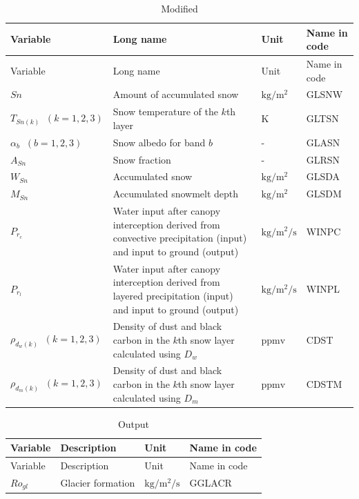 \begin{landscape}

\begin{longtable}[]{@{}llll@{}}
\caption{Modified}\tabularnewline
\toprule\noalign{}
Variable & Long name & Unit & Name in code \\
\midrule\noalign{}
\endfirsthead
\toprule\noalign{}
Variable & Long name & Unit & Name in code \\
\midrule\noalign{}
\endhead
\bottomrule\noalign{}
\endlastfoot
\(Sn\) & Amount of accumulated snow & \(\mathrm{kg/m^2}\) & GLSNW \\
\(T_{Sn(k)} \;\; (k=1,2,3)\) & Snow temperature of the \(k\)th layer & \(\mathrm{K}\) & GLTSN \\
\(\alpha_b  \;\; (b=1,2,3)\) & Snow albedo for band \(b\) & - & GLASN \\
\(A_{Sn}\) & Snow fraction & - & GLRSN \\
\(W_{Sn}\) & Accumulated snow & \(\mathrm{kg/m^2}\) & GLSDA \\
\(M_{Sn}\) & Accumulated snowmelt depth & \(\mathrm{kg/m^2}\) & GLSDM \\
\(P_{r_c}\) & Water input after canopy interception derived from convective precipitation (input) and input to ground (output) & \(\mathrm{kg/m^2/s}\) & WINPC \\
\(P_{r_l}\) & Water input after canopy interception derived from layered precipitation (input) and input to ground (output) & \(\mathrm{kg/m^2/s}\) & WINPL \\
\(\rho_{d_w(k)} \;\; (k=1,2,3)\) & Density of dust and black carbon in the \(k\)th snow layer calculated using \(D_w\) & \(\mathrm{ppmv}\) & CDST \\
\(\rho_{d_m(k)} \;\; (k=1,2,3)\) & Density of dust and black carbon in the \(k\)th snow layer calculated using \(D_m\) & \(\mathrm{ppmv}\) & CDSTM \\
\end{longtable}

\end{landscape}

\begin{longtable}[]{@{}llll@{}}
\caption{Output}\tabularnewline
\toprule\noalign{}
Variable & Description & Unit & Name in code \\
\midrule\noalign{}
\endfirsthead
\toprule\noalign{}
Variable & Description & Unit & Name in code \\
\midrule\noalign{}
\endhead
\bottomrule\noalign{}
\endlastfoot
\(Ro_{gl}\) & Glacier formation & \(\mathrm{kg/m^2/s}\) & GGLACR \\
\end{longtable}


